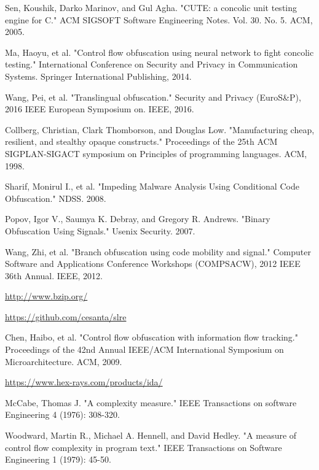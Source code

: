 \documentclass[lnicst]{svmultln}
\begin{document}
%
%
\begin{thebibliography}{5}

 Sen, Koushik, Darko Marinov, and Gul Agha. "CUTE: a concolic unit testing engine for C." ACM SIGSOFT Software Engineering Notes. Vol. 30. No. 5. ACM, 2005.

 Ma, Haoyu, et al. "Control flow obfuscation using neural network to fight concolic testing." International Conference on Security and Privacy in Communication Systems. Springer International Publishing, 2014.

 Wang, Pei, et al. "Translingual obfuscation." Security and Privacy (EuroS\&P), 2016 IEEE European Symposium on. IEEE, 2016.

 Collberg, Christian, Clark Thomborson, and Douglas Low. "Manufacturing cheap, resilient, and stealthy opaque constructs." Proceedings of the 25th ACM SIGPLAN-SIGACT symposium on Principles of programming languages. ACM, 1998.

 Sharif, Monirul I., et al. "Impeding Malware Analysis Using Conditional Code Obfuscation." NDSS. 2008.

 Popov, Igor V., Saumya K. Debray, and Gregory R. Andrews. "Binary Obfuscation Using Signals." Usenix Security. 2007.

 Wang, Zhi, et al. "Branch obfuscation using code mobility and signal." Computer Software and Applications Conference Workshops (COMPSACW), 2012 IEEE 36th Annual. IEEE, 2012.

 \url{http://www.bzip.org/}

 \url{https://github.com/cesanta/slre}

 Chen, Haibo, et al. "Control flow obfuscation with information flow tracking." Proceedings of the 42nd Annual IEEE/ACM International Symposium on Microarchitecture. ACM, 2009.

 \url{https://www.hex-rays.com/products/ida/}

 McCabe, Thomas J. "A complexity measure." IEEE Transactions on software Engineering 4 (1976): 308-320.

 Woodward, Martin R., Michael A. Hennell, and David Hedley. "A measure of control flow complexity in program text." IEEE Transactions on Software Engineering 1 (1979): 45-50.


\end{thebibliography}
%
\end{document}
